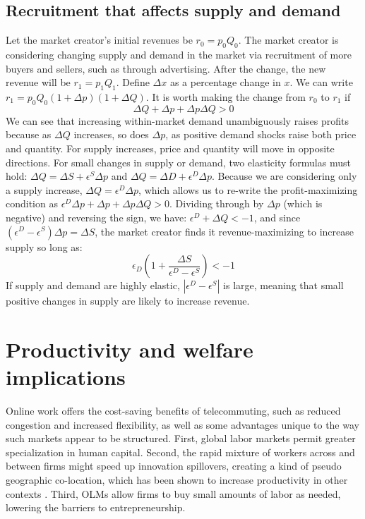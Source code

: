 \documentclass{llncs}
\begin{document}
\subsection{Recruitment that affects supply and demand} 
Let the market creator's initial revenues be $r_0 = p_0 Q_0$. The
market creator is considering changing supply and demand in the market
via recruitment of more buyers and sellers, such as through
advertising.  After the change, the new revenue will be $r_1 = p_1
Q_1$. Define $\Delta x$ as a percentage change in $x$. We can write
$r_1 = p_0Q_0(1+\Delta p)(1+\Delta Q)$. It is worth making the change
from $r_0$ to $r_1$ if
\begin{equation}
\Delta Q + \Delta p + \Delta p \Delta Q > 0
\end{equation} 
We can see that increasing within-market demand unambiguously raises
profits because as $\Delta Q$ increases, so does $\Delta p$, as
positive demand shocks raise both price and quantity. For
supply increases, price and quantity will move in opposite
directions. For small changes in supply or demand, two elasticity
formulas must hold: $\Delta Q = \Delta S + \epsilon^S \Delta p$ and
$\Delta Q = \Delta D + \epsilon^D \Delta p$. Because we are
considering only a supply increase, $\Delta Q = \epsilon^D \Delta p$,
which allows us to re-write the profit-maximizing condition as
$\epsilon^D \Delta p + \Delta p + \Delta p \Delta Q > 0$. Dividing
through by $\Delta p$ (which is negative) and reversing the sign, we
have: $\epsilon^D + \Delta Q < -1$, and since $(\epsilon^D -
\epsilon^S)\Delta p = \Delta S$, the market creator finds it revenue-maximizing
to increase supply so long as:
\begin{equation}
\epsilon_D \left(1 + \frac{\Delta S}{\epsilon^D - \epsilon^S} \right) < -1
\end{equation} 
If supply and demand are highly elastic, $|\epsilon^D - \epsilon^S|$
is large, meaning that small positive changes in supply are likely to
increase revenue. 

\section{Productivity and welfare implications}
Online work offers the cost-saving benefits of telecommuting, such
as reduced congestion and increased flexibility, as well as some advantages
unique to the way such markets appear to be structured. First,
global labor markets permit greater specialization in human
capital. Second, the rapid mixture of workers across and between firms
might speed up innovation spillovers, creating a kind of pseudo
geographic co-location, which has been shown to increase productivity
in other contexts \cite{greenstone2008identifying}. Third, OLMs allow
firms to buy small amounts of labor as needed, lowering the barriers
to entrepreneurship.
\end{document}
